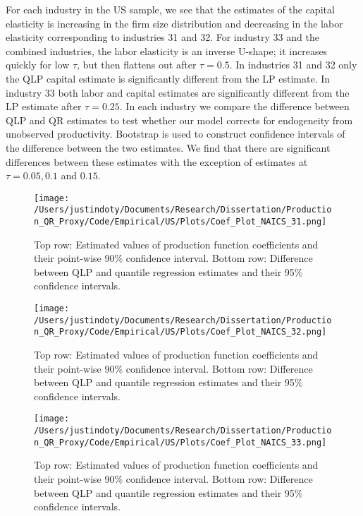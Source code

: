 \documentclass[11pt]{article}
\begin{document}

\label{Tab:USsummary}
For each industry in the US sample, we see that the estimates of the capital elasticity is increasing in the firm size distribution and decreasing in the labor elasticity corresponding to industries 31 and 32. For industry 33 and the combined industries, the labor elasticity is an inverse U-shape; it increases quickly for low $\tau$, but then flattens out after $\tau=0.5$. In industries 31 and 32 only the QLP capital estimate is significantly different from the LP estimate. In industry 33 both labor and capital estimates are significantly different from the LP estimate after $\tau=0.25$. In each industry we compare the difference between QLP and QR estimates to test whether our model corrects for endogeneity from unobserved productivity. Bootstrap is used to construct confidence intervals of the difference between the two estimates. We find that there are significant differences between these estimates with the exception of estimates at $\tau=0.05, 0.1$ and $0.15$.\\

\begin{figure}[H]
\centering
\texttt{[image: /Users/justindoty/Documents/Research/Dissertation/Production\_QR\_Proxy/Code/Empirical/US/Plots/Coef\_Plot\_NAICS\_31.png]}
\caption{Top row: Estimated values of production function coefficients and their point-wise 90\% confidence interval. Bottom row: Difference between QLP and quantile regression estimates and their 95\% confidence intervals.}
\label{fig:31coef}
\end{figure}

\begin{figure}[H]
\centering
\texttt{[image: /Users/justindoty/Documents/Research/Dissertation/Production\_QR\_Proxy/Code/Empirical/US/Plots/Coef\_Plot\_NAICS\_32.png]}
\caption{Top row: Estimated values of production function coefficients and their point-wise 90\% confidence interval. Bottom row: Difference between QLP and quantile regression estimates and their 95\% confidence intervals.}
\label{fig:32coef}
\end{figure}

\begin{figure}[H]
\centering
\texttt{[image: /Users/justindoty/Documents/Research/Dissertation/Production\_QR\_Proxy/Code/Empirical/US/Plots/Coef\_Plot\_NAICS\_33.png]}
\caption{Top row: Estimated values of production function coefficients and their point-wise 90\% confidence interval. Bottom row: Difference between QLP and quantile regression estimates and their 95\% confidence intervals.}
\label{fig:33coef}
\end{figure}
\end{document}
